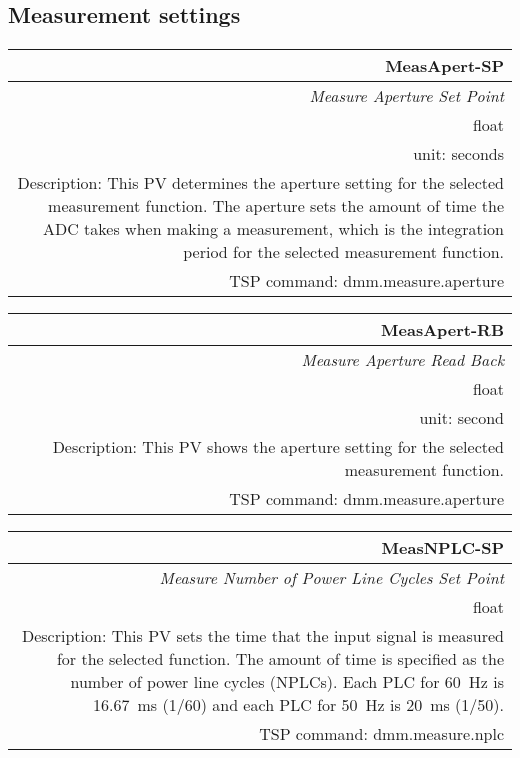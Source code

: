 \documentclass[openany]{article}
\begin{document}
	\subsection{Measurement settings}\label{pvgroup:meas-settings}

		\paragraph{} %

		\begin{tabular}{N}
			\hline
			\bfseries MeasApert-SP\label{pv:measapert-sp} \\ \hline
			\emph{Measure Aperture Set Point} \\
			float \\
			unit: seconds \\
			Description: This PV determines the aperture setting for the selected measurement function. The aperture sets the amount of time the ADC takes when making a measurement, which is the integration period for the selected measurement function. \\
			TSP command: dmm.measure.aperture
		\end{tabular}

		\begin{tabular}{N}
			\hline
			\bfseries MeasApert-RB\label{pv:measapert-rb} \\ \hline
			\emph{Measure Aperture Read Back} \\
			float \\
			unit: second \\
			Description: This PV shows the aperture setting for the selected measurement function. \\
			TSP command: dmm.measure.aperture
		\end{tabular}

		\begin{tabular}{N}
			\hline
			\bfseries MeasNPLC-SP\label{pv:measnplc-sp} \\ \hline
			\emph{Measure Number of Power Line Cycles Set Point} \\
			float \\
			Description: This PV sets the time that the input signal is measured for the selected function. The amount of time is specified as the number of power line cycles (NPLCs). Each PLC for \SI{60}{\hertz} is \SI{16.67}{\milli\second} (1/60) and each PLC for \SI{50}{\hertz} is \SI{20}{\milli\second} (1/50). \\
			TSP command: dmm.measure.nplc
		\end{tabular}
\end{document}
